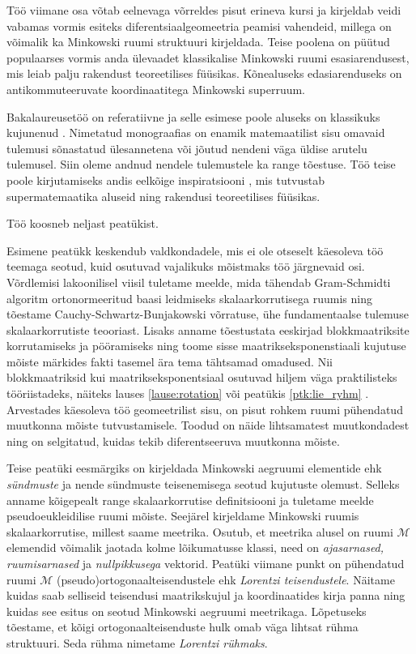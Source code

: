 \documentclass[12pt]{article}
\theoremstyle{plain}
\theoremstyle{definition}
\numberwithin{equation}{section}
\def\M{{\mathcal M}}
\begin{document}
Töö viimane osa võtab eelnevaga võrreldes pisut erineva kursi 
ja kirjeldab veidi vabamas vormis esiteks diferentsiaalgeomeetria 
peamisi vahendeid, millega on võimalik ka Minkowski ruumi 
struktuuri kirjeldada. Teise poolena on püütud populaarses 
vormis anda ülevaadet klassikalise Minkowski ruumi 
esasiarendusest, mis leiab palju rakendust teoreetilises 
füüsikas. Kõnealuseks edasiarenduseks on antikommuteeruvate 
koordinaatitega Minkowski superruum.

Bakalaureusetöö on referatiivne ja selle esimese poole aluseks 
on klassikuks kujunenud \cite{Naber}. Nimetatud monograafias
on enamik matemaatilist sisu omavaid tulemusi sõnastatud 
ülesannetena või jõutud nendeni väga üldise arutelu tulemusel. 
Siin oleme andnud nendele tulemustele ka range tõestuse. Töö 
teise poole kirjutamiseks andis eelkõige inspiratsiooni 
\cite{Super}, mis tutvustab supermatemaatika aluseid ning 
rakendusi teoreetilises füüsikas.

Töö koosneb neljast peatükist.

Esimene peatükk keskendub valdkondadele, mis ei ole otseselt 
käesoleva töö teemaga seotud, kuid osutuvad vajalikuks 
mõistmaks töö järgnevaid osi. Võrdlemisi lakoonilisel 
viisil tuletame meelde, mida tähendab Gram-Schmidti algoritm 
ortonormeeritud baasi leidmiseks skalaarkorrutisega ruumis ning 
tõestame Cauchy-Schwartz-Bunjakowski võrratuse, ühe 
fundamentaalse tulemuse skalaarkorrutiste teooriast. Lisaks 
anname tõestustata eeskirjad blokkmaatriksite korrutamiseks 
ja pööramiseks ning toome sisse maatrikseksponenstiaali kujutuse 
mõiste märkides fakti tasemel ära tema tähtsamad omadused. 
Nii blokkmaatriksid kui maatrikseksponentsiaal osutuvad hiljem 
väga praktilisteks tööriistadeks, näiteks lauses 
\ref{lause:rotation} või peatükis \ref{ptk:lie_ryhm} 
. Arvestades käesoleva 
töö geomeetrilist sisu, on pisut rohkem ruumi pühendatud 
muutkonna mõiste tutvustamisele. Toodud on näide lihtsamatest 
muutkondadest ning on selgitatud, kuidas tekib diferentseeruva 
muutkonna mõiste.

Teise peatüki eesmärgiks on kirjeldada Minkowski aegruumi 
elementide ehk \emph{sündmuste} ja nende sündmuste teisenemisega 
seotud kujutuste olemust. Selleks anname kõigepealt range 
skalaarkorrutise definitsiooni ja tuletame meelde 
pseudoeukleidilise ruumi mõiste. Seejärel kirjeldame 
Minkowski ruumis skalaarkorrutise, millest saame meetrika. 
Osutub, et meetrika alusel on ruumi $\M$ elemendid võimalik 
jaotada kolme lõikumatusse klassi, need on \emph{ajasarnased, 
ruumisarnased} ja \emph{nullpikkusega} vektorid. 
Peatüki viimane punkt on pühendatud ruumi $\M$ 
(pseudo)ortogonaalteisendustele ehk \emph{Lorentzi 
teisendustele}. Näitame kuidas saab selliseid 
teisendusi maatrikskujul ja koordinaatides kirja panna ning 
kuidas see esitus on seotud Minkowski aegruumi meetrikaga. 
Lõpetuseks tõestame, et kõigi ortogonaalteisenduste hulk 
omab väga lihtsat rühma struktuuri. Seda rühma nimetame 
\emph{Lorentzi rühmaks}.
\end{document}
